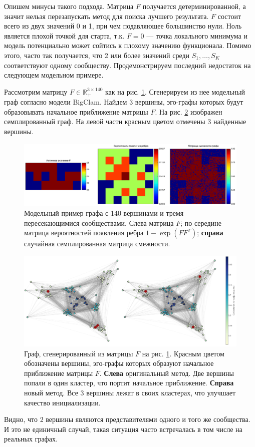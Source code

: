 \documentclass{ITaSconf}
\def\RR{\mathbb{R}}
\begin{document}
	Опишем минусы такого подхода. 
	Матрица $F$ получается детерминированной, а значит нельзя перезапускать метод для поиска лучшего результата.
	$F$ состоит всего из двух значений 0 и 1, при чем подавляющее большинство нули. 
	Ноль является плохой точкой для старта, т.к. $F=0$ --- точка локального минимума и модель потенциально может сойтись к плохому значению функционала.
	Помимо этого, часто так получается, что 2 или более значений среди $S_1, \dots, S_K$ соответствуют одному сообществу. 
	Продемонстрируем последний недостаток на следующем модельном примере.
	
	Рассмотрим матрицу $F\in \RR_{+}^{3\times 140}$ как на рис. \ref{fig:model_ex}. 
	Сгенерируем из нее модельный граф согласно модели BigClam. 
	Найдем 3 вершины, эго-графы которых будут образовывать начальное приближение матрицы $F$. 
	На рис. \ref{fig:model_ex_graph} изображен семплированный граф. 
	На левой части красным цветом отмечены 3 найденные вершины.
	\begin{figure}[!ht]
		\centering
		\includegraphics[width=\linewidth]{imgs/model_example.png}
		\caption{Модельный пример графа с 140 вершинами и тремя пересекающимися сообществами. Слева матрица $F$; по середине матрица вероятностей появления ребра $1-\exp(FF^T)$; \textbf{справа} случайная семплированная матрица смежности.}
		\label{fig:model_ex}
	\end{figure}
	\begin{figure}[!ht]
		\centering
		\includegraphics[width=\linewidth]{imgs/model_example_graph_good_init_pres.png}
		\caption{Граф, сгенерированный из матрицы $F$ на рис. \ref{fig:model_ex}. Красным цветом обозначены вершины, эго-графы которых образуют начальное приближение матрицы $F$. \textbf{Слева} оригинальный метод. Две вершины попали в один кластер, что портит начальное приближение. \textbf{Справа} новый метод. Все 3 вершины лежат в своих кластерах, что улучшает качество инициализации.}
		\label{fig:model_ex_graph}
	\end{figure}
	Видно, что 2 вершины являются представителями одного и того же сообщества. 
	И это не единичный случай, такая ситуация часто встречалась в том числе на реальных графах. 
	
\end{document}
